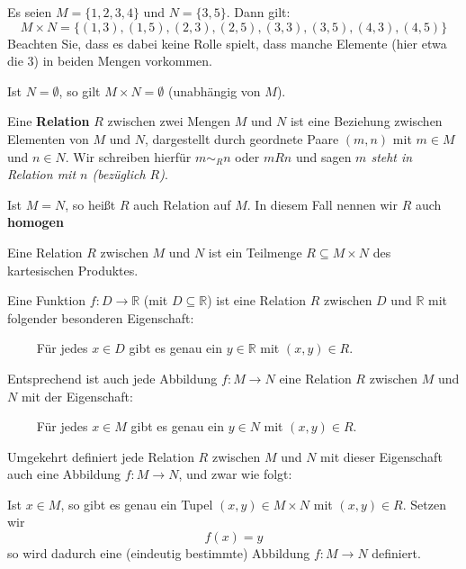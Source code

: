 	\begin{figure}[H]
	\vspace{-0.4cm}
		\begin{center}
		\begin{scaletikzpicturetowidth}{0.55\textwidth}
     			 
		\end{scaletikzpicturetowidth}
		\end{center}
	\vspace{-0.8cm}
	\end{figure}

\begin{beispiel} Es seien $M = \{ 1, 2, 3, 4\}$ und $N = \{ 3, 5 \}$. Dann gilt:
 	 $$ M \times N = \{ (1, 3),  (1, 5), (2, 3),  (2, 5), (3, 3),  (3, 5), (4, 3), (4,5) \} $$
Beachten Sie, dass es dabei keine Rolle spielt, dass manche Elemente (hier etwa die 3) in beiden Mengen 
vorkommen.
\end{beispiel}

\begin{beispiel} Ist $N = \emptyset$, so gilt $M \times N = \emptyset$ (unabhängig von $M$).
\end{beispiel}

\bigbreak

\begin{definition} Eine \textbf{Relation} $R$ zwischen zwei Mengen $M$ und $N$ ist eine Beziehung
zwischen Elementen von $M$ und $N$, dargestellt durch geordnete Paare $(m,n)$ mit $m \in M$ und $n \in N$. Wir 
schreiben hierfür $m \sim_R n$ oder $mRn$ und sagen \textit{$m$ steht in Relation mit $n$ (bezüglich $R$)}.

Ist $M = N$, so heißt $R$ auch Relation auf $M$. In diesem Fall nennen wir $R$ auch 
\textbf{homogen}

\end{definition}

\begin{notiz} Eine Relation $R$ zwischen $M$ und $N$ ist ein Teilmenge $R \subseteq M \times N$ des kartesischen 
Produktes.
\end{notiz}

\begin{notiz}
Eine Funktion $f: D \longrightarrow \mathbb R$ (mit $D \subseteq \mathbb R$) ist eine Relation $R$ zwischen $D$ und 
$\mathbb R$ mit folgender besonderen Eigenschaft: 

$\qquad$ Für jedes $x \in D$ gibt es genau ein $y \in \mathbb R$ mit $(x,y) \in R$. 

Entsprechend ist auch jede Abbildung $f: M \longrightarrow N$ eine Relation $R$ zwischen $M$ und $N$ mit der 
Eigenschaft: 

$\qquad$ Für jedes $x \in M$ gibt es genau ein $y \in N$ mit $(x,y) \in R$. 

Umgekehrt definiert jede Relation $R$ zwischen $M$ und $N$ mit dieser Eigenschaft auch eine Abbildung 
$f: M \longrightarrow N$, und zwar wie folgt: 

Ist $x \in M$, so gibt es genau ein Tupel $(x,y) \in M \times N$ mit $(x,y) \in R$. Setzen wir 
	$$ f(x) = y $$ 
so wird dadurch eine (eindeutig bestimmte) Abbildung $f: M \longrightarrow N$ definiert. 
\end{notiz}

